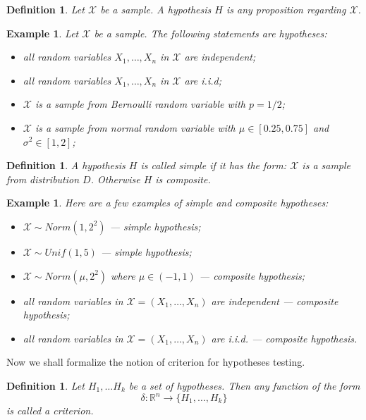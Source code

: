 \documentclass[12pt]{article}
\newtheorem{definition}[theorem]{Definition}
\newtheorem{example}[theorem]{Example}
\begin{document}
\begin{definition} Let $\mathscr{X}$ be a sample. A hypothesis $H$ is any
    proposition regarding $\mathscr{X}$.
\end{definition}

\begin{example} Let $\mathscr{X}$ be a sample. The following statements are
    hypotheses:
    \begin{itemize}
        \item all random variables $X_1,\ldots,X_n$ in $\mathscr{X}$ are
              independent;
        \item all random variables $X_1,\ldots,X_n$ in $\mathscr{X}$ are i.i.d;
        \item $\mathscr{X}$ is a sample from Bernoulli random variable with
              $p=1/2$;
        \item $\mathscr{X}$ is a sample from normal random variable with
              $\mu\in[0.25,0.75]$ and $\sigma^2\in[1,2]$;
    \end{itemize}
\end{example}

\begin{definition} A hypothesis $H$ is called simple if it has the form:
    $\mathscr{X}$ is a sample from distribution $D$. Otherwise $H$ is
    composite.
\end{definition}

\begin{example} Here are a few examples of simple and composite hypotheses:
    \begin{itemize}
        \item $\mathscr{X}\sim Norm(1, 2^2)$ --- simple hypothesis;
        \item $\mathscr{X}\sim Unif(1, 5)$ --- simple hypothesis;
        \item $\mathscr{X}\sim Norm(\mu, 2^2)$ where $\mu\in(-1,1)$ ---
              composite hypothesis;
        \item all random variables in $\mathscr{X}=(X_1,\ldots,X_n)$ are
              independent --- composite hypothesis;
        \item all random variables in $\mathscr{X}=(X_1,\ldots,X_n)$ are i.i.d.
              --- composite hypothesis.
    \end{itemize}
\end{example}

Now we shall formalize the notion of criterion for hypotheses testing.

\begin{definition} Let $H_1,\ldots H_k$ be a set of hypotheses. Then any
    function of the form
    $$
        \delta:\mathbb{R}^n\to \{H_1,\ldots, H_k\}
    $$
    is called a criterion.
\end{definition}
\end{document}
